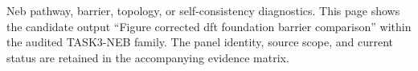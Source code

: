 Neb pathway, barrier, topology, or self-consistency diagnostics. This page shows the candidate output ``Figure corrected dft foundation barrier comparison'' within the audited TASK3-NEB family. The panel identity, source scope, and current status are retained in the accompanying evidence matrix.

